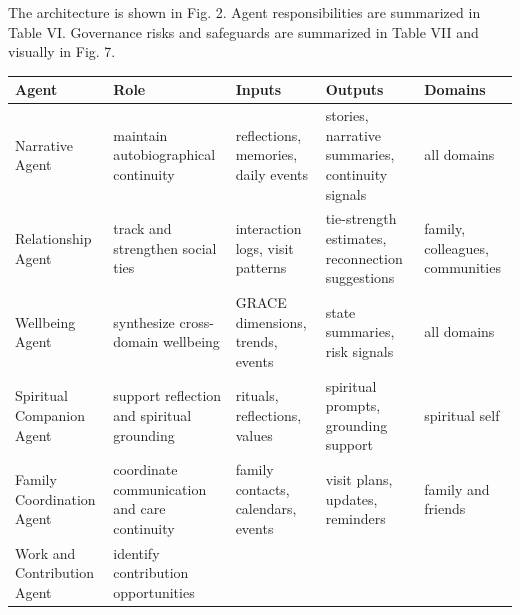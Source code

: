 \documentclass[
  journal,
]{IEEEtran}%
\newcounter{none} %
\begin{document}
The architecture is shown in Fig. 2. Agent responsibilities are
summarized in Table VI. Governance risks and safeguards are summarized
in Table VII and visually in Fig. 7.

{\def\LTcaptype{none} %
\begin{longtable}[]{@{}
  >{\raggedright\arraybackslash}p{}
  >{\raggedright\arraybackslash}p{}
  >{\raggedright\arraybackslash}p{}
  >{\raggedright\arraybackslash}p{}
  >{\raggedright\arraybackslash}p{}@{}}
\toprule\noalign{}
\begin{minipage}[b]{\linewidth}\raggedright
Agent
\end{minipage} & \begin{minipage}[b]{\linewidth}\raggedright
Role
\end{minipage} & \begin{minipage}[b]{\linewidth}\raggedright
Inputs
\end{minipage} & \begin{minipage}[b]{\linewidth}\raggedright
Outputs
\end{minipage} & \begin{minipage}[b]{\linewidth}\raggedright
Domains
\end{minipage} \\
\midrule\noalign{}
\endhead
\bottomrule\noalign{}
\endlastfoot
Narrative Agent & maintain autobiographical continuity & reflections,
memories, daily events & stories, narrative summaries, continuity
signals & all domains \\
Relationship Agent & track and strengthen social ties & interaction
logs, visit patterns & tie-strength estimates, reconnection suggestions
& family, colleagues, communities \\
Wellbeing Agent & synthesize cross-domain wellbeing & GRACE dimensions,
trends, events & state summaries, risk signals & all domains \\
Spiritual Companion Agent & support reflection and spiritual grounding &
rituals, reflections, values & spiritual prompts, grounding support &
spiritual self \\
Family Coordination Agent & coordinate communication and care continuity
& family contacts, calendars, events & visit plans, updates, reminders &
family and friends \\
Work and Contribution Agent & identify contribution opportunities &

\end{longtable}}
\end{document}
